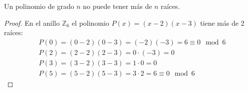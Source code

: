 \begin{ce}
    Un polinomio de grado $n$ no puede tener más de $n$ raíces.
\end{ce}

\begin{proof}
    En el anillo $\mathbb{Z}_{6}$ el polinomio $P(x)=(x-2)(x-3)$ tiene más de 2 raíces:
    \begin{equation}
        \begin{split}
            & P(0) = (0-2)(0-3) = (-2)(-3) = 6 \equiv 0 \mod 6\\
            & P(2) = (2-2)(2-3) = 0\cdot (-3) = 0\\
            & P(3) = (3-2)(3-3) = 1 \cdot 0 = 0\\
            & P(5) = (5-2)(5-3) = 3 \cdot 2 = 6 \equiv 0 \mod 6
        \end{split}
    \end{equation}
\end{proof}
